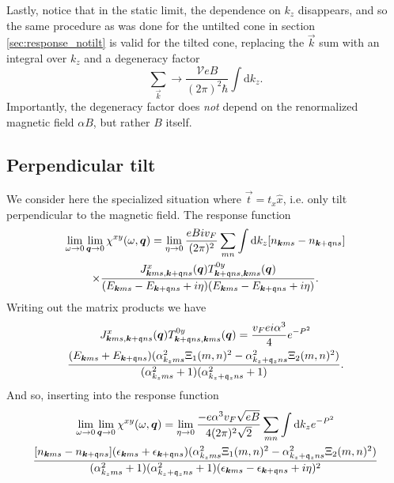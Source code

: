 Lastly, notice that in the static limit, the dependence on \( k_z \) disappears, and so the same procedure as was done for the untilted cone in section \ref{sec:response_notilt} is valid for the tilted cone, replacing the \( \vec{k} \) sum with an integral over \( k_z \) and a degeneracy factor
\begin{equation}
  \label{eq:103}
  \sum\limits_{\vec{k}}^{} \to \frac{\mathcal{V} e B}{(2\pi)^2 \hbar} \int \mathrm{d} k_z.
\end{equation}
Importantly, the degeneracy factor does \emph{not} depend on the renormalized magnetic field \( \alpha B \), but rather \( B \) itself.

\subsection{Perpendicular tilt}
\label{sec:perptiltsum}
We consider here the specialized situation where \( \vec{t} = t_x \hat{x} \), i.e. only tilt perpendicular to the magnetic field.
The response function
\begin{multline*}
  \lim_{\omega \to 0} \lim_{\bm{q} \to 0} \chi^{xy}(\omega, \bm{q}) = \lim_{\eta \to 0}
  \frac{e B i v_F}{(2 \pi)^2}
  \sum\limits_{mn}^{} \int \mathrm{d}k_z [n_{\bm{k} m s} - n_{\bm{k}+\mathfrak{q} n s}]\\
  \times \frac{
    J^x_{\bm{k} m s, \bm{k} + \mathfrak{q} ns} (\bm{q}) T^{0y}_{\bm{k}+\mathfrak{q} n s, \bm{k}ms}(\bm{q})
  }{
    (E_{\bm{k} m s} - E_{\bm{k}+\mathfrak{q} ns} + i \eta)(E_{\bm{k}ms}-E_{\bm{k}+\mathfrak{q} ns} + i \eta)
  }.
\end{multline*}
Writing out the matrix products we have
\begin{multline}
  J^x_{\bm{k} m s, \bm{k} + \mathfrak{q} ns} (\bm{q}) T^{0y}_{\bm{k}+\mathfrak{q} n s, \bm{k}ms}(\bm{q})
  =
  \frac{v_F e i \alpha^{3}}{4}
  e^{-P^2}\\
  \frac{
    (E_{\bm{k} m s} + E_{\bm{k}+\mathfrak{q} n s})
    (\alpha_{k_z m s}^2 \Xi_1(m,n)^2 - \alpha_{k_z + \mathfrak{q}_z n s}^2 \Xi_2(m,n)^2)
  }{
    (\alpha_{k_z m s}^2 + 1)(\alpha_{k_z + \mathfrak{q}_z n s}^2 + 1)
  }.
  \label{eq:100}
\end{multline}
And so, inserting into the response function
\begin{multline}
  \label{eq:101}
  \lim_{\omega \to 0} \lim_{\bm{q} \to 0} \chi^{xy}(\omega, \bm{q}) = \lim_{\eta \to 0}
  \frac{- e \alpha^3 v_F \sqrt{e B} }{4 (2 \pi)^2 \sqrt{2} }
  \sum\limits_{mn}^{}
  \int \mathrm{d}k_z
  e^{-P^2}\\
  \frac{
    [n_{\bm{k} m s} - n_{\bm{k}+\mathfrak{q} n s}]
    (\epsilon_{\bm{k} m s} + \epsilon_{\bm{k}+\mathfrak{q} n s})
    (\alpha_{k_z m s}^2 \Xi_1(m,n)^2 - \alpha_{k_z + \mathfrak{q}_z n s}^2 \Xi_2(m,n)^2)
  }{
    (\alpha_{k_z m s}^2 + 1)(\alpha_{k_z + \mathfrak{q}_z n s}^2 + 1)
    (\epsilon_{\bm{k} m s} - \epsilon_{\bm{k}+\mathfrak{q} ns} + i \eta)^2
  }
\end{multline}

